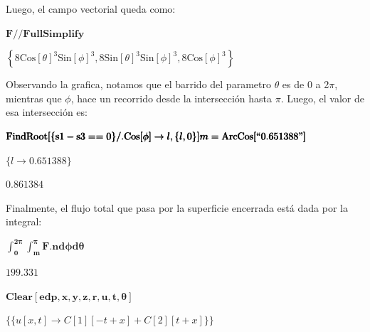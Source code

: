 \documentclass{article}
\begin{document}
Luego, el campo vectorial queda como:

\begin{doublespace}
\noindent\(\pmb{F \text{//}\text{FullSimplify}}\)
\end{doublespace}

\begin{doublespace}
\noindent\(\left\{8 \text{Cos}[\theta ]^3 \text{Sin}[\phi ]^3,8 \text{Sin}[\theta ]^3 \text{Sin}[\phi ]^3,8 \text{Cos}[\phi ]^3\right\}\)
\end{doublespace}

Observando la grafica, notamos que el barrido del parametro $\theta $ es de 0 a 2$\pi $, mientras que $\phi $, hace un recorrido desde la intersecci{\'
o}n hasta $\pi $. Luego, el valor de esa intersecci{\' o}n es:

\begin{doublespace}
\noindent\(\pmb{\text{FindRoot}[\{\text{s1}-\text{s3}==0\}\text{/.}\text{Cos}[\phi ]\to l,\{l,0\}]}\\
\pmb{m=\text{ArcCos}[\text{{``}0.651388{''}}]}\)
\end{doublespace}

\begin{doublespace}
\noindent\(\{l\to 0.651388\}\)
\end{doublespace}

\begin{doublespace}
\noindent\(0.861384\)
\end{doublespace}

Finalmente, el flujo total que pasa por la superficie encerrada est{\' a} dada por la integral:

\begin{doublespace}
\noindent\(\pmb{\int _0^{2\pi }\int _m^{\pi }F.nd\phi d\theta }\)
\end{doublespace}

\begin{doublespace}
\noindent\(199.331\)
\end{doublespace}

\begin{doublespace}
\noindent\(\pmb{\text{Clear}[\text{edp},x,y,z,r,u,t,\theta ]}\)
\end{doublespace}

\begin{doublespace}
\noindent\(\{\{u[x,t]\to C[1][-t+x]+C[2][t+x]\}\}\)
\end{doublespace}
\end{document}

